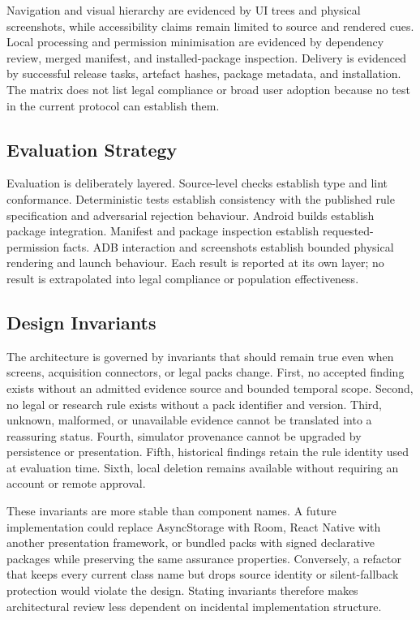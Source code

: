 Navigation and visual hierarchy are evidenced by UI trees and physical screenshots, while accessibility claims remain limited to source and rendered cues. Local processing and permission minimisation are evidenced by dependency review, merged manifest, and installed-package inspection. Delivery is evidenced by successful release tasks, artefact hashes, package metadata, and installation. The matrix does not list legal compliance or broad user adoption because no test in the current protocol can establish them.

\subsection{Evaluation Strategy}

Evaluation is deliberately layered. Source-level checks establish type and lint conformance. Deterministic tests establish consistency with the published rule specification and adversarial rejection behaviour. Android builds establish package integration. Manifest and package inspection establish requested-permission facts. ADB interaction and screenshots establish bounded physical rendering and launch behaviour. Each result is reported at its own layer; no result is extrapolated into legal compliance or population effectiveness.

\subsection{Design Invariants}

The architecture is governed by invariants that should remain true even when screens, acquisition connectors, or legal packs change. First, no accepted finding exists without an admitted evidence source and bounded temporal scope. Second, no legal or research rule exists without a pack identifier and version. Third, unknown, malformed, or unavailable evidence cannot be translated into a reassuring status. Fourth, simulator provenance cannot be upgraded by persistence or presentation. Fifth, historical findings retain the rule identity used at evaluation time. Sixth, local deletion remains available without requiring an account or remote approval.

These invariants are more stable than component names. A future implementation could replace AsyncStorage with Room, React Native with another presentation framework, or bundled packs with signed declarative packages while preserving the same assurance properties. Conversely, a refactor that keeps every current class name but drops source identity or silent-fallback protection would violate the design. Stating invariants therefore makes architectural review less dependent on incidental implementation structure.

